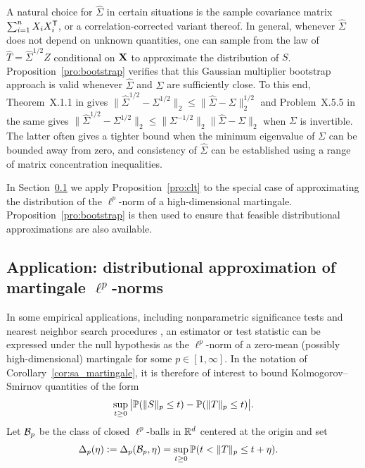 A natural choice for $\hat\Sigma$ in certain situations is the sample
covariance matrix $\sum_{i=1}^n X_i X_i^\T$, or a correlation-corrected variant
thereof. In general, whenever $\hat \Sigma$ does not depend on unknown
quantities, one can sample from the law of $\hat T = \hat\Sigma^{1/2} Z$
conditional on $\bX$ to approximate the distribution of $S$.
Proposition~\ref{pro:bootstrap} verifies that this Gaussian multiplier
bootstrap approach is valid whenever $\hat\Sigma$ and $\Sigma$ are sufficiently
close. To this end, Theorem~X.1.1 in \citet{bhatia1997matrix} gives
$\big\|\hat\Sigma^{1/2} - \Sigma^{1/2}\big\|_2
\leq \big\|\hat\Sigma - \Sigma\big\|_2^{1/2}$
and Problem~X.5.5 in the same gives
$\big\|\hat\Sigma^{1/2} - \Sigma^{1/2}\big\|_2
\leq \big\|\Sigma^{-1/2}\big\|_2 \big\|\hat\Sigma - \Sigma\big\|_2$
when $\Sigma$ is invertible. The latter often gives a tighter bound when the
minimum eigenvalue of $\Sigma$ can be bounded away from zero, and consistency
of $\hat \Sigma$ can be established using a range of matrix concentration
inequalities.

In Section~\ref{sec:lp} we apply Proposition~\ref{pro:clt} to the special case
of approximating the distribution of the $\ell^p$-norm of a high-dimensional
martingale. Proposition~\ref{pro:bootstrap} is then used to ensure that
feasible distributional approximations are also available.

\subsection{Application: distributional approximation of martingale
\texorpdfstring{$\ell^p$}{lp}-norms}
\label{sec:lp}

In some empirical applications,
including nonparametric significance tests
\citep{lopes2020bootstrapping}
and nearest neighbor search procedures
\citep{biau2015high},
an estimator or test statistic
can be expressed under the null hypothesis
as the $\ell^p$-norm of a zero-mean
(possibly high-dimensional) martingale for some $p \in [1, \infty]$.
In the notation of Corollary~\ref{cor:sa_martingale},
it is therefore of interest to bound Kolmogorov--Smirnov
quantities of the form
%
\begin{align*}
  \sup_{t \geq 0}
  \big| \P( \|S\|_p \leq t)
  - \P( \|T\|_p \leq t) \big|.
\end{align*}
%
Let $\cB_p$ be the class of closed $\ell^p$-balls in $\R^d$ centered at the
origin and set
%
\begin{align*}
  \Delta_p(\eta)
  &\vcentcolon=
  \Delta_p(\cB_p, \eta)
  = \sup_{t \geq 0}
  \P( t < \|T\|_p \leq t + \eta ).
\end{align*}
%

